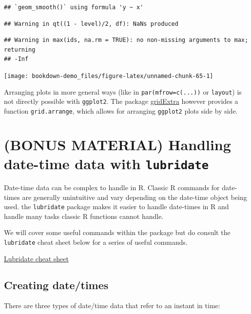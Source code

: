 \documentclass[
]{book}
\begin{document}
\begin{verbatim}
## `geom_smooth()` using formula 'y ~ x'
\end{verbatim}

\begin{verbatim}
## Warning in qt((1 - level)/2, df): NaNs produced
\end{verbatim}

\begin{verbatim}
## Warning in max(ids, na.rm = TRUE): no non-missing arguments to max; returning
## -Inf
\end{verbatim}

\texttt{[image: bookdown-demo\_files/figure-latex/unnamed-chunk-65-1]}

Arranging plots in more general ways (like in \texttt{par(mfrow=c(...))} or \texttt{layout}) is not directly possible with \texttt{ggplot2}. The package \href{https://cran.r-project.org/web/packages/gridExtra}{gridExtra} however provides a function \texttt{grid.arrange}, which allows for arranging \texttt{ggplot2} plots side by side.

\hypertarget{bonus-material-handling-date-time-data-with-lubridate}{%
\chapter{\texorpdfstring{(BONUS MATERIAL) Handling date-time data with \texttt{lubridate}}{(BONUS MATERIAL) Handling date-time data with lubridate}}\label{bonus-material-handling-date-time-data-with-lubridate}}

Date-time data can be complex to handle in R. Classic R commands for date-times are generally unintuitive and vary depending on the date-time object being used. the \texttt{lubridate} package makes it easier to handle date-times in R and handle many tasks classic R functions cannot handle.

We will cover some useful commands within the package but do consult the \texttt{lubridate} cheat sheet below for a series of useful commands.

\href{\%22https://rawgit.com/rstudio/cheatsheets/main/lubridate.pdf\%22}{Lubridate cheat sheet}

\hypertarget{creating-datetimes}{%
\section{Creating date/times}\label{creating-datetimes}}

There are three types of date/time data that refer to an instant in time:
\end{document}
